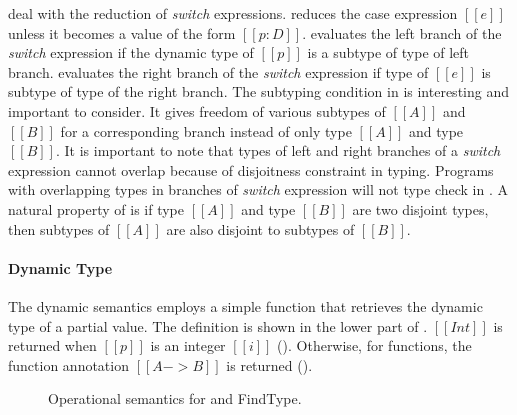  deal with the reduction
of \emph{switch} expressions.
 reduces the case expression $[[e]]$ unless it
becomes a value of the form $[[p:D]]$.   evaluates
the left branch of the \emph{switch} expression if the dynamic type of $[[p]]$ is
a subtype of type of left branch.   evaluates the right
branch of the \emph{switch} expression if type of $[[e]]$ is subtype
of type of the right branch. The subtyping condition in  is interesting and important to consider. It gives
freedom of various subtypes of $[[A]]$ and $[[B]]$ for a corresponding
branch instead of only type $[[A]]$ and type $[[B]]$. It is important
to note that types of left and right branches of a \emph{switch}
expression cannot overlap because of disjoitness constraint in
typing. Programs with overlapping types in branches of \emph{switch}
expression will not type check in \cal.
A natural property of \cal is
if type $[[A]]$ and type $[[B]]$ are two disjoint types, then subtypes
of $[[A]]$ are also disjoint to subtypes of $[[B]]$.


\paragraph{Dynamic Type} The dynamic semantics employs a simple
function that retrieves the dynamic type of a partial value. The definition
is shown in the lower part of .
$[[Int]]$ is returned when $[[p]]$ is an integer $[[i]]$ ().
Otherwise, for functions, the function annotation $[[A -> B]]$ is returned
().

\begin{figure}[t]
  \begin{small}
    \centering
  \end{small}
  \begin{small}
    \centering
  \end{small}
  \caption{Operational semantics for \cal and FindType.}
  \label{fig:union:os}
\end{figure}

